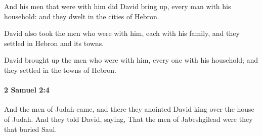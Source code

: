 			\begin{versebox}
					\item[BHS] 
					\item[ASV] And his men that were with him did David bring up, every man with his household: and they dwelt in the cities of Hebron.
					\item[NIV] David also took the men who were with him, each with his family, and they settled in Hebron and its towns.
					\item[NRSV] David brought up the men who were with him, every one with his household; and they settled in the towns of Hebron.
			\end{versebox}

		\paragraph{2 Samuel 2:4} %
			\label{2SAMUEL-2-4}

			And the men of Judah came, and there they anointed David king over the house of Judah. And they told David, saying, That the men of Jabeshgilead were they that buried Saul.

